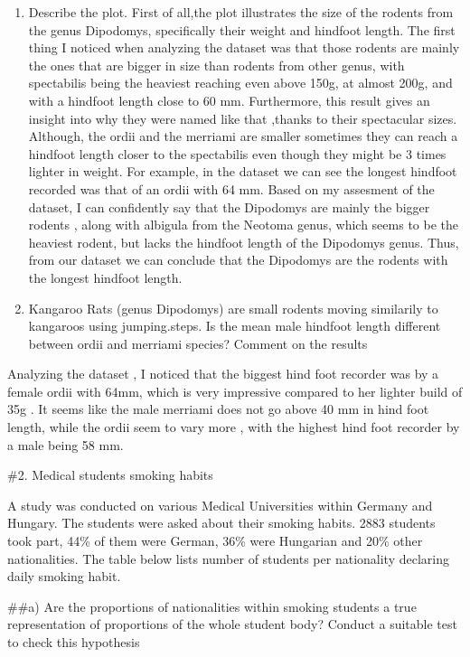 \documentclass[
]{article}
\begin{document}
\begin{enumerate}
\def\labelenumi{\alph{enumi})}
\setcounter{enumi}{3}
\item
  Describe the plot. First of all,the plot illustrates the size of the
  rodents from the genus Dipodomys, specifically their weight and
  hindfoot length. The first thing I noticed when analyzing the dataset
  was that those rodents are mainly the ones that are bigger in size
  than rodents from other genus, with spectabilis being the heaviest
  reaching even above 150g, at almost 200g, and with a hindfoot length
  close to 60 mm. Furthermore, this result gives an insight into why
  they were named like that ,thanks to their spectacular sizes.
  Although, the ordii and the merriami are smaller sometimes they can
  reach a hindfoot length closer to the spectabilis even though they
  might be 3 times lighter in weight. For example, in the dataset we can
  see the longest hindfoot recorded was that of an ordii with 64 mm.
  Based on my assesment of the dataset, I can confidently say that the
  Dipodomys are mainly the bigger rodents , along with albigula from the
  Neotoma genus, which seems to be the heaviest rodent, but lacks the
  hindfoot length of the Dipodomys genus. Thus, from our dataset we can
  conclude that the Dipodomys are the rodents with the longest hindfoot
  length.
\item
  Kangaroo Rats (genus Dipodomys) are small rodents moving similarily to
  kangaroos using jumping.steps. Is the mean male hindfoot length
  different between ordii and merriami species? Comment on the results
\end{enumerate}

Analyzing the dataset , I noticed that the biggest hind foot recorder
was by a female ordii with 64mm, which is very impressive compared to
her lighter build of 35g . It seems like the male merriami does not go
above 40 mm in hind foot length, while the ordii seem to vary more ,
with the highest hind foot recorder by a male being 58 mm.

\#2. Medical students smoking habits

A study was conducted on various Medical Universities within Germany and
Hungary. The students were asked about their smoking habits. 2883
students took part, 44\% of them were German, 36\% were Hungarian and
20\% other nationalities. The table below lists number of students per
nationality declaring daily smoking habit.

\#\#a) Are the proportions of nationalities within smoking students a
true representation of proportions of the whole student body? Conduct a
suitable test to check this hypothesis
\end{document}
